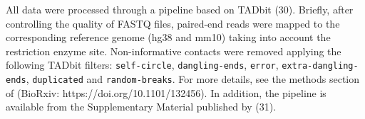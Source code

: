 \documentclass[a4,center,fleqn]{NAR}
\providecommand{\DIFadd}[1]{{\protect\color{red}#1}} %
\providecommand{\DIFdel}[1]{{\protect}}                      %
\providecommand{\DIFaddbegin}{} %
\providecommand{\DIFaddend}{} %
\providecommand{\DIFdelbegin}{} %
\providecommand{\DIFdelend}{} %
\begin{document}



All data were processed through a pipeline based on TADbit
(\DIFdelbegin \DIFdel{31}\DIFdelend \DIFaddbegin \DIFadd{30}\DIFaddend ). Briefly, after controlling the quality of
FASTQ files, paired-end reads were mapped to the corresponding reference
genome (hg38 and mm10) taking into account the restriction enzyme site.
Non-informative contacts were removed applying the following TADbit
filters: \texttt{self-circle}, \texttt{dangling-ends}, \texttt{error},
\texttt{extra-dangling-ends}, \texttt{duplicated} and
\texttt{random-breaks}. For more details, see the methods section of
(\DIFdelbegin \DIFdel{27}\DIFdelend \DIFaddbegin \DIFadd{BioRxiv: https://doi.org/10.1101/132456}\DIFaddend ). In addition, the pipeline is
available from the \DIFdelbegin \DIFdel{supplementary material }\DIFdelend \DIFaddbegin \DIFadd{Supplementary Material }\DIFaddend published by
(\DIFdelbegin \DIFdel{32}\DIFdelend \DIFaddbegin \DIFadd{31}\DIFaddend ).
\end{document}
